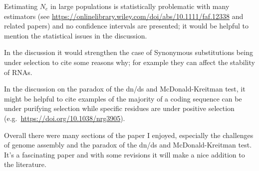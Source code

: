 
\begin{point}{} %
Estimating $N_e$ in large populations is statistically problematic with
many estimators (see
\url{https://onlinelibrary.wiley.com/doi/abs/10.1111/faf.12338} and
related papers) and no confidence intervals are presented; it would be
helpful to mention the statistical issues in the discussion.
\end{point}


\begin{point}{} %
In the discussion it would strengthen the case of Synonymous
substitutions being under selection to cite some reasons why; for example
they can affect the stability of RNAs.
\end{point}


\begin{point}{} %
In the discussion on the paradox of the dn/ds and McDonald-Kreitman test,
it might be helpful to cite examples of the majority of a coding sequence
can be under purifying selection while specific residues are under
positive selection (e.g.\ \url{https://doi.org/10.1038/nrg3905}).
\end{point}


\begin{point}{} %
Overall there were many sections of the paper I enjoyed, especially the
challenges of genome assembly and the paradox of the dn/ds and
McDonald-Kreitman test. It's a fascinating paper and with some revisions
it will make a nice addition to the literature.
\end{point}


\pagebreak


